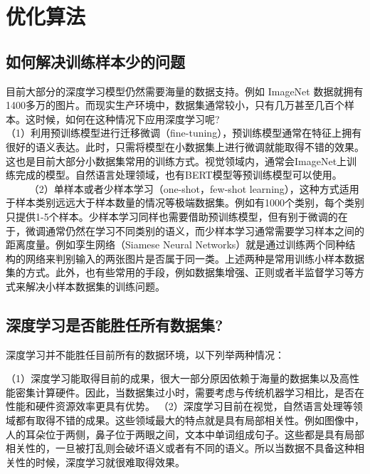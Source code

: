 \chapter{优化算法}\label{ux7b2cux4e00ux5341ux4e09ux7ae0-ux4f18ux5316ux7b97ux6cd5}

\section{如何解决训练样本少的问题}\label{ux5982ux4f55ux89e3ux51b3ux8badux7ec3ux6837ux672cux5c11ux7684ux95eeux9898}

目前大部分的深度学习模型仍然需要海量的数据支持。例如 ImageNet
数据就拥有1400多万的图片。而现实生产环境中，数据集通常较小，只有几万甚至几百个样本。这时候，如何在这种情况下应用深度学习呢?\\
（1）利用预训练模型进行迁移微调（fine-tuning），预训练模型通常在特征上拥有很好的语义表达。此时，只需将模型在小数据集上进行微调就能取得不错的效果。这也是目前大部分小数据集常用的训练方式。视觉领域内，通常会ImageNet上训练完成的模型。自然语言处理领域，也有BERT模型等预训练模型可以使用。
   （2）单样本或者少样本学习（one-shot，few-shot
learning），这种方式适用于样本类别远远大于样本数量的情况等极端数据集。例如有1000个类别，每个类别只提供1-5个样本。少样本学习同样也需要借助预训练模型，但有别于微调的在于，微调通常仍然在学习不同类别的语义，而少样本学习通常需要学习样本之间的距离度量。例如孪生网络（Siamese
Neural
Networks）就是通过训练两个同种结构的网络来判别输入的两张图片是否属于同一类。
​
上述两种是常用训练小样本数据集的方式。此外，也有些常用的手段，例如数据集增强、正则或者半监督学习等方式来解决小样本数据集的训练问题。

\section{深度学习是否能胜任所有数据集?}\label{ux6df1ux5ea6ux5b66ux4e60ux662fux5426ux80fdux80dcux4efbux6240ux6709ux6570ux636eux96c6}

深度学习并不能胜任目前所有的数据环境，以下列举两种情况：

（1）深度学习能取得目前的成果，很大一部分原因依赖于海量的数据集以及高性能密集计算硬件。因此，当数据集过小时，需要考虑与传统机器学习相比，是否在性能和硬件资源效率更具有优势。
（2）深度学习目前在视觉，自然语言处理等领域都有取得不错的成果。这些领域最大的特点就是具有局部相关性。例如图像中，人的耳朵位于两侧，鼻子位于两眼之间，文本中单词组成句子。这些都是具有局部相关性的，一旦被打乱则会破坏语义或者有不同的语义。所以当数据不具备这种相关性的时候，深度学习就很难取得效果。

